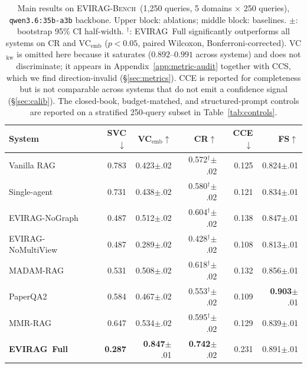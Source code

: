 \documentclass[11pt]{article}
\newcommand{\system}{\textsc{EVIRAG}\xspace}
\newcommand{\bench}{\textsc{EVIRAG-Bench}\xspace}
\begin{document}
\begin{table}[t]
\centering\small
\setlength{\tabcolsep}{4pt}
\begin{tabular}{@{}lrrrrr@{}}
\toprule
\textbf{System} & SVC$\downarrow$ & VC$_{\text{emb}}$$\uparrow$ & CR$\uparrow$ & CCE$\downarrow$ & FS$\uparrow$ \\
\midrule
Vanilla RAG              & 0.783 & 0.423\tiny{$\pm$.02} & 0.572$^\dagger$\tiny{$\pm$.02} & 0.125 & 0.824\tiny{$\pm$.01} \\
Single-agent             & 0.731 & 0.438\tiny{$\pm$.02} & 0.580$^\dagger$\tiny{$\pm$.02} & 0.121 & 0.834\tiny{$\pm$.01} \\
\system-NoGraph          & 0.487 & 0.512\tiny{$\pm$.02} & 0.604$^\dagger$\tiny{$\pm$.02} & 0.138 & 0.847\tiny{$\pm$.01} \\
\system-NoMultiView      & 0.487 & 0.289\tiny{$\pm$.02} & 0.428$^\dagger$\tiny{$\pm$.02} & 0.108 & 0.813\tiny{$\pm$.01} \\
\midrule
MADAM-RAG                & 0.531 & 0.508\tiny{$\pm$.02} & 0.618$^\dagger$\tiny{$\pm$.02} & 0.132 & 0.856\tiny{$\pm$.01} \\
PaperQA2                 & 0.584 & 0.467\tiny{$\pm$.02} & 0.553$^\dagger$\tiny{$\pm$.02} & 0.109 & \textbf{0.903}\tiny{$\pm$.01} \\
MMR-RAG                  & 0.647 & 0.534\tiny{$\pm$.02} & 0.595$^\dagger$\tiny{$\pm$.02} & 0.129 & 0.839\tiny{$\pm$.01} \\
\midrule
\textbf{\system\ Full}   & \textbf{0.287} & \textbf{0.847}\tiny{$\pm$.01} & \textbf{0.742}\tiny{$\pm$.02} & 0.231 & 0.891\tiny{$\pm$.01} \\
\bottomrule
\end{tabular}
\caption{Main results on \bench\ (1,250 queries, 5 domains $\times$ 250 queries),
\texttt{qwen3.6:35b-a3b} backbone.  Upper block: ablations; middle block:
baselines.  $\pm$: bootstrap 95\% CI half-width.
$^\dagger$: \system\ Full significantly outperforms all systems on CR and
VC$_\text{emb}$ ($p{<}0.05$, paired Wilcoxon, Bonferroni-corrected).
VC$_\text{kw}$ is omitted here because it saturates
($0.892$--$0.991$ across systems) and does not discriminate; it appears in
Appendix~\ref{app:metric-audit} together with CCS, which we find
direction-invalid (\S\ref{sec:metrics}).  CCE is reported for completeness but
is not comparable across systems that do not emit a confidence signal
(\S\ref{sec:calib}).  The closed-book, budget-matched, and structured-prompt
controls are reported on a stratified 250-query subset in
Table~\ref{tab:controls}.}
\label{tab:ablation}
\end{table}
\end{document}
